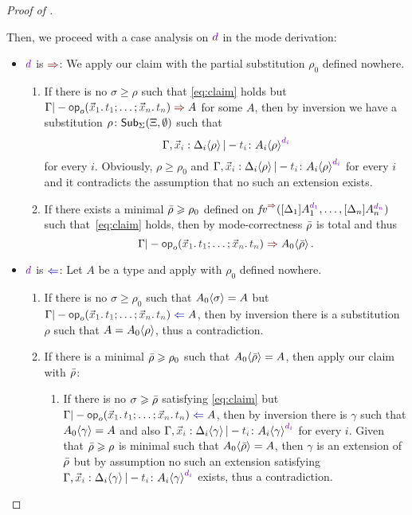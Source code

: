 \begin{proof}[Proof of {}]
\begin{itemize}
      Then, we proceed with a case analysis on $\dir{d}$ in the mode derivation:
      \begin{itemize}
        \item $\dir{d}$ is $\syn$: We apply our claim with the partial substitution $\rho_0$ defined nowhere.
          \begin{enumerate}
            \item If there is no $\sigma \geq \rho$ such that \eqref{eq:claim} holds but $\Gamma |- \tmOpts \syn A$ for some $A$, then by inversion we have a substitution $\rho\colon \mathsf{Sub}_{\Sigma}(\Xi,\emptyset)$ such that
              \[
                \Gamma, \vars{x}_\isTerm{i} : \simsub{\Delta_i}{\rho} |- \isTerm{t_i} \colon \simsub{A_i}{\rho}^{\dir{d_i}}
              \]
              for every $i$.
              Obviously, $\rho \geq \rho_0$ and ${\Gamma, \vars{x}_\isTerm{i} : \simsub{\Delta_i}{\rho} |- \isTerm{t_i} \colon \simsub{A_i}{\rho}^{\dir{d_i}}}$ for every $i$ and it contradicts the assumption that no such an extension exists.

            \item If there exists a minimal $\bar{\rho} \geqslant \rho_0$ defined on $\synvar(\biargs)$ such that~\eqref{eq:claim} holds, then by mode-correctness $\bar{\rho}$ is total and thus
              \[
                \Gamma |- \tmOpts \syn \simsub{A_0}{\ext{\rho}}.
              \]
          \end{enumerate}

        \item $\dir{d}$ is $\chk$: Let $A$ be a type and apply  with $\rho_0$ defined nowhere.
          \begin{enumerate}
            \item If there is no $\sigma \geq \rho_0$ such that ${A_0}\!\left<{\sigma}\right> = A$ but $\Gamma |- \tmOpts \chk A$, then by inversion there is a substitution $\rho$ such that $A = {A_0}\!\left<{\rho}\right>$, thus a contradiction.
            \item If there is a minimal $\bar{\rho} \geqslant \rho_0$ such that ${A_0}\!\left<{\bar{\rho}}\right> = A$, then apply our claim with $\bar{\rho}$:
              \begin{enumerate}
                \item If there is no $\sigma \geqslant \bar{\rho}$ satisfying \eqref{eq:claim} but $\Gamma |- \tmOpts \chk A$, then by inversion there is $\gamma$ such that ${A_0}\!\left<{\gamma}\right> = A$ and also ${\Gamma, \vars{x}_\isTerm{i} : \simsub{\Delta_i}{\gamma} |- \isTerm{t_i} \colon \simsub{A_i}{\gamma}^{\dir{d_i}}}$ for every $i$.
                  Given that $\bar{\rho} \geqslant \rho$ is minimal such that ${A_0}\!\left<{\bar{\rho}}\right> = A$, then $\gamma$ is an extension of $\bar{\rho}$ but by assumption no such an extension satisfying ${\Gamma, \vars{x}_\isTerm{i} : \simsub{\Delta_i}{\gamma} |- \isTerm{t_i} \colon \simsub{A_i}{\gamma}^{\dir{d_i}}}$ exists, thus a contradiction.
                

\end{enumerate}
\end{enumerate}
\end{itemize}
\end{itemize}
\end{proof}
